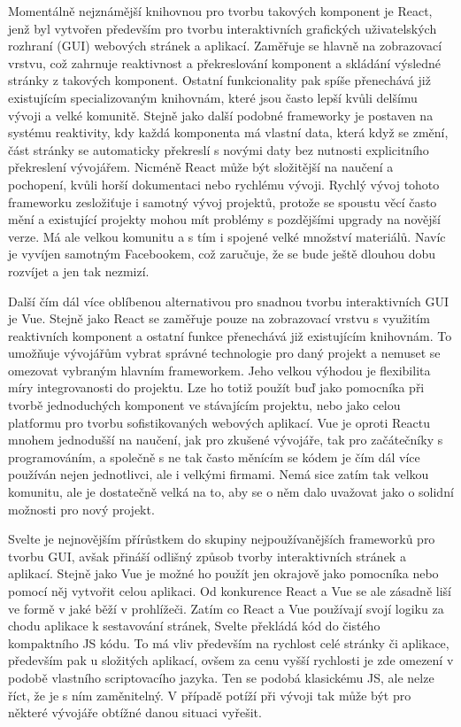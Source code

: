 		Momentálně nejznámější knihovnou pro tvorbu takových komponent je React, jenž
		byl vytvořen především pro tvorbu interaktivních grafických uživatelských rozhraní (\noindent\Acs{GUI}) webových stránek a
		aplikací.
		Zaměřuje se hlavně na zobrazovací vrstvu, což zahrnuje reaktivnost a překreslování komponent a skládání
		výsledné stránky z takových komponent.
		Ostatní funkcionality pak spíše přenechává již existujícím specializovaným knihovnám, které jsou
		často lepší kvůli delšímu vývoji a velké komunitě.
		Stejně jako další podobné frameworky je postaven na systému reaktivity, kdy každá komponenta má vlastní data,
		která když se změní, část stránky se automaticky překreslí s novými daty bez nutnosti explicitního překreslení
		vývojářem.
		Nicméně React může být složitější na naučení a pochopení, kvůli horší dokumentaci nebo rychlému vývoji.
		Rychlý vývoj tohoto frameworku zesložiťuje i samotný vývoj projektů, protože se spoustu věcí často mění a existující
		projekty mohou mít problémy s pozdějšími upgrady na novější verze.
		Má ale velkou komunitu a s tím i spojené velké množství materiálů.
		Navíc je vyvíjen samotným Facebookem, což zaručuje, že se bude ještě dlouhou dobu rozvíjet a jen tak
		nezmizí. \cite{react}

		Další čím dál více oblíbenou alternativou pro snadnou tvorbu interaktivních \Ac{GUI} je Vue.
		Stejně jako React se zaměřuje pouze na zobrazovací vrstvu s využitím reaktivních komponent a ostatní
		funkce přenechává již existujícím knihovnám.
		To umožňuje vývojářům vybrat správné technologie pro daný projekt a nemuset se omezovat vybraným hlavním frameworkem.
		Jeho velkou výhodou je flexibilita míry integrovanosti do projektu.
		Lze ho totiž použít buď jako pomocníka při tvorbě jednoduchých komponent ve stávajícím projektu, nebo jako
		celou platformu pro tvorbu sofistikovaných webových aplikací. \cite{vue_guide}
		Vue je oproti Reactu mnohem jednodušší na naučení, jak pro zkušené vývojáře, tak pro začátečníky
		s programováním, a společně s ne tak často měnícím se kódem je čím dál více používán nejen
		jednotlivci, ale i velkými firmami.
		Nemá sice zatím tak velkou komunitu, ale je dostatečně velká na to, aby se o něm dalo uvažovat
		jako o solidní možnosti pro nový projekt. \cite{vue_vs_react}

		Svelte je nejnovějším přírůstkem do skupiny nejpoužívanějších frameworků pro tvorbu \Ac{GUI}, avšak přináší odlišný
		způsob tvorby interaktivních stránek a aplikací.
		Stejně jako Vue je možné ho použít jen okrajově jako pomocníka nebo pomocí něj vytvořit celou aplikaci.
		Od konkurence React a Vue se ale zásadně liší ve formě v jaké běží v prohlížeči.
		Zatím co React a Vue používají svojí logiku za chodu aplikace k sestavování stránek, Svelte překládá kód
		do čistého kompaktního \ac{JS} kódu.
		To má vliv především na rychlost celé stránky či aplikace, především pak u složitých aplikací,
		ovšem za cenu vyšší rychlosti je zde omezení v podobě vlastního scriptovacího jazyka. \cite{svelte_basics}
		Ten se podobá klasickému \ac{JS}, ale nelze říct, že je s ním zaměnitelný.
		V případě potíží při vývoji tak může být pro některé vývojáře obtížné danou situaci vyřešit. \cite{vue_vs_svelte}

